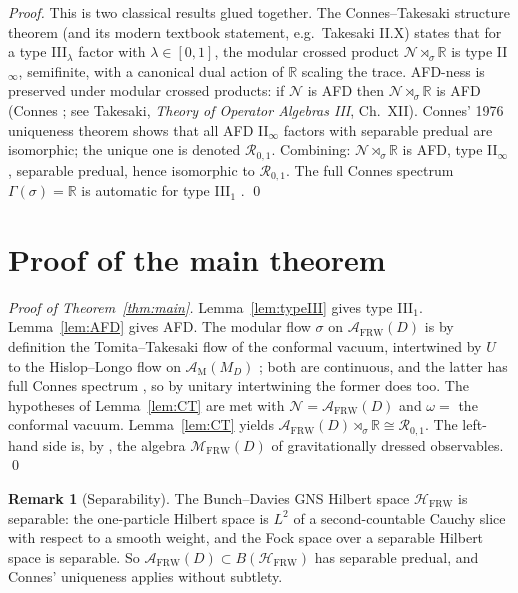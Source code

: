 \documentclass[11pt]{article}
\theoremstyle{definition}
\newtheorem{remark}[theorem]{Remark}
\newcommand{\R}{\mathbb{R}}
\newcommand{\HH}{\mathcal{H}}
\renewcommand{\AA}{\mathcal{A}}
\newcommand{\MM}{\mathcal{M}}
\newcommand{\RR}{\mathcal{R}}
\newcommand{\FRW}{\mathrm{FRW}}
\newcommand{\Mink}{\mathrm{M}}
\newcommand{\NN}{\mathcal{N}}
\begin{document}
\begin{proof}
This is two classical results glued together. The
Connes--Takesaki structure theorem \cite{ConnesTakesaki1977} (and its
modern textbook statement, e.g.\ Takesaki II.X) states that for a
type III$_\lambda$ factor with $\lambda\in[0,1]$, the modular crossed
product $\NN\rtimes_\sigma\R$ is type II$_\infty$, semifinite, with a
canonical dual action of $\R$ scaling the trace. AFD-ness is preserved
under modular crossed products: if $\NN$ is AFD then
$\NN\rtimes_\sigma\R$ is AFD (Connes \cite[Thm.~3]{Connes1976}; see
Takesaki, \emph{Theory of Operator Algebras III}, Ch.~XII). Connes'
1976 uniqueness theorem \cite{Connes1976} shows that all AFD
II$_\infty$ factors with separable predual are isomorphic; the unique
one is denoted $\RR_{0,1}$. Combining: $\NN\rtimes_\sigma\R$ is AFD,
type II$_\infty$, separable predual, hence isomorphic to $\RR_{0,1}$.
The full Connes spectrum $\Gamma(\sigma)=\R$ is automatic for type
III$_1$ \cite{ConnesTakesaki1977}.
\qed
\end{proof}

\section{Proof of the main theorem}\label{sec:proof}

\begin{proof}[Proof of Theorem~\ref{thm:main}]
Lemma~\ref{lem:typeIII} gives type III$_1$.
Lemma~\ref{lem:AFD} gives AFD.
The modular flow $\sigma$ on $\AA_\FRW(D)$ is by definition the
Tomita--Takesaki flow of the conformal vacuum, intertwined by
$U$ to the Hislop--Longo flow on $\AA_\Mink(M_D)$
\cite[\S3.3]{FrwNote2026}; both are continuous, and the latter has full
Connes spectrum \cite{HislopLongo1982}, so by unitary intertwining the
former does too. The hypotheses of Lemma~\ref{lem:CT} are met with
$\NN=\AA_\FRW(D)$ and $\omega=$ the conformal vacuum. Lemma~\ref{lem:CT}
yields
$\AA_\FRW(D)\rtimes_\sigma\R \cong \RR_{0,1}$.
The left-hand side is, by \cite[Thm.~3.5]{FrwNote2026}, the algebra
$\MM_\FRW(D)$ of gravitationally dressed observables. \qed
\end{proof}

\begin{remark}[Separability]\label{rmk:sep}
The Bunch--Davies GNS Hilbert space $\HH_\FRW$ is separable: the one-particle
Hilbert space is $L^2$ of a second-countable Cauchy slice with respect to a
smooth weight, and the Fock space over a separable Hilbert space is
separable. So $\AA_\FRW(D)\subset B(\HH_\FRW)$ has separable predual, and
Connes' \cite{Connes1976} uniqueness applies without subtlety.
\end{remark}
\end{document}
